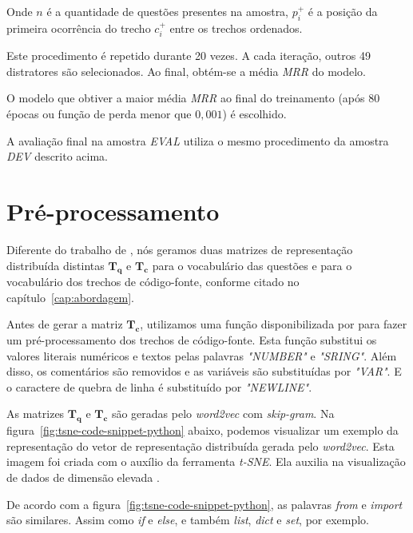 Onde $n$ é a quantidade de questões presentes na amostra, $p_{i}^{+}$ é a posição da primeira ocorrência do trecho $c_{i}^{+}$ entre os trechos ordenados.

Este procedimento é repetido durante 20 vezes. A cada iteração, outros 49 distratores são selecionados. Ao final, obtém-se a média \emph{MRR} do modelo.

O modelo que obtiver a maior média \emph{MRR} ao final do treinamento (após 80 épocas ou função de perda menor que $0,001$) é escolhido.

A avaliação final na amostra \emph{EVAL} utiliza o mesmo procedimento da amostra \emph{DEV} descrito acima.

\section{Pré-processamento}

Diferente do trabalho de \cite{tan-lstm-qa}, nós geramos duas matrizes de representação distribuída distintas $\bm{T_{q}}$ e $\bm{T_{c}}$ para o vocabulário das questões e para o vocabulário dos trechos de código-fonte, conforme citado no capítulo~\ref{cap:abordagem}.

Antes de gerar a matriz $\bm{T_{c}}$, utilizamos uma função disponibilizada por \cite{yao-2018} para fazer um pré-processamento dos trechos de código-fonte. Esta função substitui os valores literais numéricos e textos pelas palavras \emph{"NUMBER"} e \emph{"SRING"}. Além disso, os comentários são removidos e as variáveis são substituídas por \emph{"VAR"}. E o caractere de quebra de linha é substituído por \emph{"NEWLINE"}.

As matrizes $\bm{T_{q}}$ e $\bm{T_{c}}$ são geradas pelo \textit{word2vec} com \textit{skip-gram}. Na figura~\ref{fig:tsne-code-snippet-python} abaixo, podemos visualizar um exemplo da representação do vetor de representação distribuída gerada pelo \textit{word2vec}. Esta imagem foi criada com o auxílio da ferramenta \textit{t-SNE}. Ela auxilia na visualização de dados de dimensão elevada \citep{scikit-learn-tsne-2019, quora-tsne-2019}.

De acordo com a figura~\ref{fig:tsne-code-snippet-python}, as palavras \emph{from} e \emph{import} são similares. Assim como \emph{if} e \emph{else}, e também \emph{list}, \emph{dict} e \emph{set}, por exemplo.

